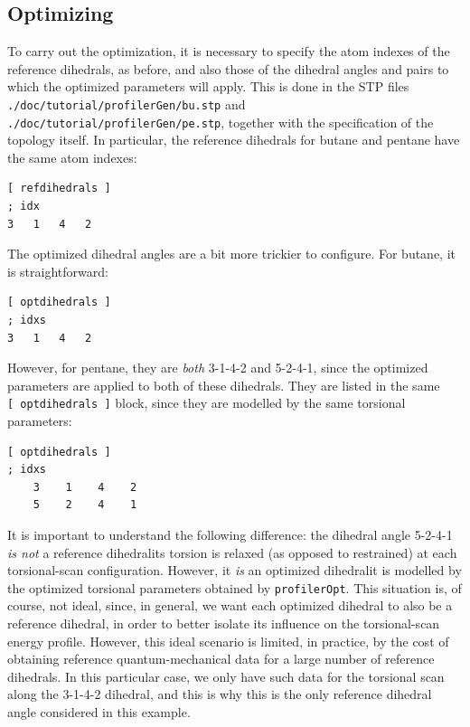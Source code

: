 \documentclass[10pt,a4paper,openany]{memoir}
\numberwithin{equation}{section}
\newcommand{\profileropt}[0]{\texttt{profilerOpt}}
\begin{document}
\subsection{Optimizing}
\label{sec:tutorial-profileropt}

To carry out the optimization, it is necessary to specify the atom
indexes of the reference dihedrals, as before, and also those of the
dihedral angles and pairs to which the optimized parameters will
apply.
%
This is done in the STP files
\texttt{./doc/tutorial/profilerGen/bu.stp} and
\texttt{./doc/tutorial/profilerGen/pe.stp}, together with the
specification of the topology itself.
%
In particular, the reference dihedrals for butane and pentane have the
same atom indexes:

\begin{lstlisting}[language=gromacs]
[ refdihedrals ]
; idx
3   1   4   2
\end{lstlisting}\vspace{2ex}\par

The optimized dihedral angles are a bit more trickier to configure.
For butane, it is straightforward:

\begin{lstlisting}[language=gromacs]
[ optdihedrals ]
; idxs
3   1   4   2   
\end{lstlisting}\vspace{2ex}\par

\noindent However, for pentane, they are \textit{both} 3-1-4-2 and 5-2-4-1,
since the optimized parameters are applied to both of these dihedrals.
They are listed in the same \texttt{[~optdihedrals~]} block, since they are
modelled by the same torsional parameters:

\begin{lstlisting}[language=gromacs]
[ optdihedrals ]
; idxs
    3    1    4    2
    5	 2    4	   1
\end{lstlisting}\vspace{2ex}\par

\noindent It is important to understand the following difference: the dihedral
angle 5-2-4-1 \textit{is not} a reference dihedral\textemdash{}its torsion is
relaxed (as opposed to restrained) at each torsional-scan
configuration. However, it \textit{is} an optimized dihedral\textemdash{}it is
modelled by the optimized torsional parameters obtained by \profileropt{}.  This
situation is, of course, not ideal, since, in general, we want each optimized
dihedral to also be a reference dihedral, in order to better isolate its
influence on the torsional-scan energy profile. However, this ideal scenario is
limited, in practice, by the cost of obtaining reference quantum-mechanical data
for a large number of reference dihedrals. In this particular case, we only have
such data for the torsional scan along the 3-1-4-2 dihedral, and this is why
this is the only reference dihedral angle considered in this example.
\end{document}
